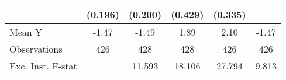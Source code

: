 {\begin{tabular}{l*{5}{c}}
            &     (0.196)         &     (0.200)         &     (0.429)         &     (0.335)         &                     \\
\midrule
Mean Y      &       -1.47         &       -1.49         &        1.89         &        2.10         &       -1.47         \\
Observations&         426         &         428         &         428         &         426         &         426         \\
Exc. Inst. F-stat&                     &      11.593         &      18.106         &      27.794         &       9.813         \\
\bottomrule
\end{tabular}
}
